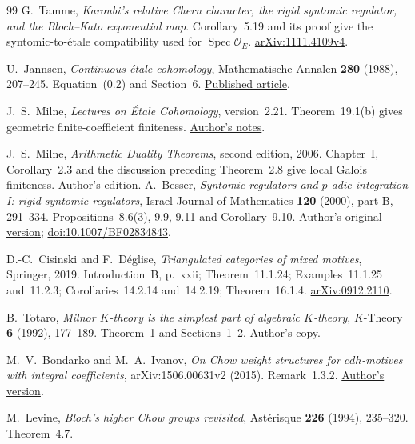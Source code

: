 \documentclass[11pt,a4paper]{article}
\theoremstyle{remark}
\newcommand{\OO}{\mathcal O}
\newcommand{\Spec}{\operatorname{Spec}}
\begin{document}
\begin{thebibliography}{99}
G.~Tamme, \emph{Karoubi's relative Chern character, the rigid syntomic regulator, and the Bloch--Kato exponential map}. Corollary~5.19 and its proof give the syntomic-to-\'etale compatibility used for $\Spec\OO_E$.
\href{https://arxiv.org/abs/1111.4109}{arXiv:1111.4109v4}.

U.~Jannsen, \emph{Continuous \'etale cohomology}, Mathematische Annalen \textbf{280} (1988), 207--245. Equation~(0.2) and Section~6.
\href{https://epub.uni-regensburg.de/26684/1/jannsen12.pdf}{Published article}.

J.~S.~Milne, \emph{Lectures on \'Etale Cohomology}, version~2.21. Theorem~19.1(b) gives geometric finite-coefficient finiteness.
\href{https://www.jmilne.org/math/CourseNotes/LEC.pdf}{Author's notes}.

J.~S.~Milne, \emph{Arithmetic Duality Theorems}, second edition, 2006. Chapter~I, Corollary~2.3 and the discussion preceding Theorem~2.8 give local Galois finiteness.
\href{https://www.jmilne.org/math/Books/ADTnot.pdf}{Author's edition}.
A.~Besser, \emph{Syntomic regulators and $p$-adic integration I:
rigid syntomic regulators}, Israel Journal of Mathematics
\textbf{120} (2000), part B, 291--334.
Propositions~8.6(3), 9.9, 9.11 and Corollary~9.10.
\href{https://www.math.bgu.ac.il/~bessera/reg/reg.html}{Author's original version};
\href{https://doi.org/10.1007/BF02834843}{doi:10.1007/BF02834843}.

D.-C.~Cisinski and F.~D\'eglise,
\emph{Triangulated categories of mixed motives}, Springer, 2019.
Introduction~B, p.~xxii; Theorem~11.1.24;
Examples~11.1.25 and~11.2.3; Corollaries~14.2.14 and~14.2.19;
Theorem~16.1.4.
\href{https://arxiv.org/abs/0912.2110}{arXiv:0912.2110}.

B.~Totaro, \emph{Milnor $K$-theory is the simplest part of algebraic
$K$-theory}, $K$-Theory \textbf{6} (1992), 177--189.
Theorem~1 and Sections~1--2.
\href{https://www.math.ucla.edu/~totaro/papers/public_html/milnor.pdf}
{Author's copy}.

M.~V.~Bondarko and M.~A.~Ivanov,
\emph{On Chow weight structures for $cdh$-motives with integral coefficients},
arXiv:1506.00631v2 (2015). Remark~1.3.2.
\href{https://arxiv.org/abs/1506.00631}{Author's version}.

M.~Levine,
\emph{Bloch's higher Chow groups revisited},
Ast\'erisque \textbf{226} (1994), 235--320. Theorem~4.7.


\end{thebibliography}
\end{document}
